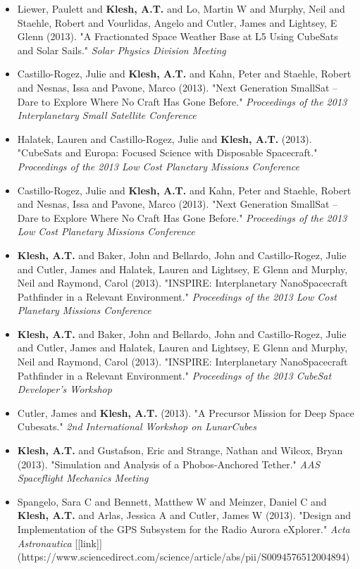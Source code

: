 \documentclass[11pt,letterpaper]{article}
\begin{document}
\begin{itemize}
\item Liewer, Paulett and \textbf{Klesh, A.T.} and Lo, Martin W and Murphy, Neil and Staehle, Robert and Vourlidas, Angelo and Cutler, James and Lightsey, E Glenn (2013). "A Fractionated Space Weather Base at L5 Using CubeSats and Solar Sails." \textit{Solar Physics Division Meeting}
\item Castillo-Rogez, Julie and \textbf{Klesh, A.T.} and Kahn, Peter and Staehle, Robert and Nesnas, Issa and Pavone, Marco (2013). "Next Generation SmallSat -- Dare to Explore Where No Craft Has Gone Before." \textit{Proceedings of the 2013 Interplanetary Small Satellite Conference}
\item Halatek, Lauren and Castillo-Rogez, Julie and \textbf{Klesh, A.T.} (2013). "CubeSats and Europa: Focused Science with Disposable Spacecraft." \textit{Proceedings of the 2013 Low Cost Planetary Missions Conference}
\item Castillo-Rogez, Julie and \textbf{Klesh, A.T.} and Kahn, Peter and Staehle, Robert and Nesnas, Issa and Pavone, Marco (2013). "Next Generation SmallSat -- Dare to Explore Where No Craft Has Gone Before." \textit{Proceedings of the 2013 Low Cost Planetary Missions Conference}
\item \textbf{Klesh, A.T.} and Baker, John and Bellardo, John and Castillo-Rogez, Julie and Cutler, James and Halatek, Lauren and Lightsey, E Glenn and Murphy, Neil and Raymond, Carol (2013). "INSPIRE: Interplanetary NanoSpacecraft Pathfinder in a Relevant Environment." \textit{Proceedings of the 2013 Low Cost Planetary Missions Conference}
\item \textbf{Klesh, A.T.} and Baker, John and Bellardo, John and Castillo-Rogez, Julie and Cutler, James and Halatek, Lauren and Lightsey, E Glenn and Murphy, Neil and Raymond, Carol (2013). "INSPIRE: Interplanetary NanoSpacecraft Pathfinder in a Relevant Environment." \textit{Proceedings of the 2013 CubeSat Developer's Workshop}
\item Cutler, James and \textbf{Klesh, A.T.} (2013). "A Precursor Mission for Deep Space Cubesats." \textit{2nd International Workshop on LunarCubes}
\item \textbf{Klesh, A.T.} and Gustafson, Eric and Strange, Nathan and Wilcox, Bryan (2013). "Simulation and Analysis of a Phobos-Anchored Tether." \textit{AAS Spaceflight Mechanics Meeting}
\item Spangelo, Sara C and Bennett, Matthew W and Meinzer, Daniel C and \textbf{Klesh, A.T.} and Arlas, Jessica A and Cutler, James W (2013). "Design and Implementation of the GPS Subsystem for the Radio Aurora eXplorer." \textit{Acta Astronautica} [[link]](https://www.sciencedirect.com/science/article/abs/pii/S0094576512004894)

\end{itemize}
\end{document}
